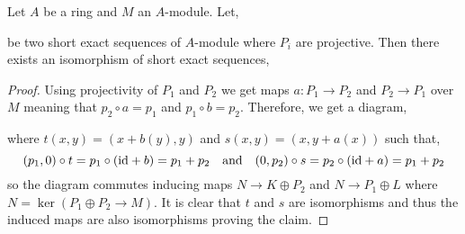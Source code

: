 \documentclass[12pt]{article}
\begin{document}
\begin{lemma}
Let $A$ be a ring and $M$ an $A$-module. Let,
\begin{center}
\end{center}
be two short exact sequences of $A$-module where $P_i$ are projective. Then there exists an isomorphism of short exact sequences,
\begin{center}
\end{center}
\end{lemma}

\begin{proof}
Using projectivity of $P_1$ and $P_2$ we get maps $a : P_1 \to P_2$ and $P_2 \to P_1$ over $M$ meaning that $p_2 \circ a = p_1$ and $p_1 \circ b = p_2$. Therefore, we get a diagram,
\begin{center}
\end{center}
where $t(x,y) = (x + b(y), y)$ and $s(x,y) = (x, y + a(x))$ such that,
\[ (p_1, 0) \circ t = p_1 \circ (\mathrm{id} + b) = p_1 + p_2 \quad \text{and} \quad (0, p_2) \circ s = p_2 \circ (\mathrm{id} + a) = p_1 + p_2 \]
so the diagram commutes inducing maps $N \to K \oplus P_2$ and $N \to P_1 \oplus L$ where $N = \ker{(P_1 \oplus P_2 \to M)}$. It is clear that $t$ and $s$ are isomorphisms and thus the induced maps are also isomorphisms proving the claim.
\end{proof}
\end{document}
